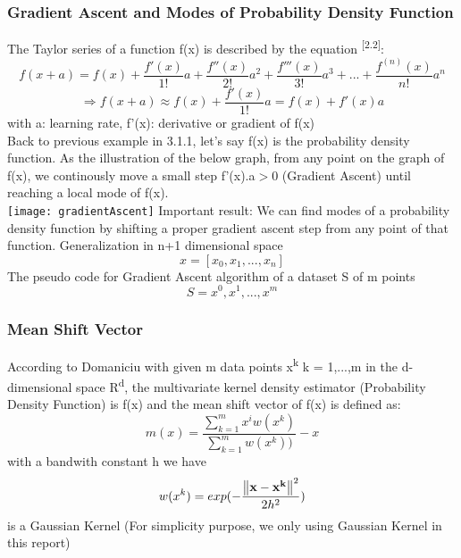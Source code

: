 \subsubsection{Gradient Ascent and Modes of Probability Density Function}
The Taylor series of a function f(x) is described by the equation \textsuperscript{[2.2]}:
\[
    f(x+a) = f(x) + \frac{f'(x)}{1!}a+\frac{f''(x)}{2!}a^2+\frac{f'''(x)}{3!}a^3+...+\frac{f^{(n)}(x)}{n!}a^n
\]
\[\Longrightarrow f(x+a) \approx f(x) + \frac{f'(x)}{1!}a =  f(x) + f'(x)a\]
with a: learning rate,  f'(x): derivative or gradient of f(x)\\
Back to previous example in 3.1.1, let's say f(x) is the probability density function. As the illustration of the below graph, from any point on the graph of f(x), we continously move a small step f'(x).a$>$0 (Gradient Ascent) until reaching a local mode of f(x).\\ 
\texttt{[image: gradientAscent]}
Important result: We can find modes of a probability density function by shifting a proper gradient ascent step from any point of that function. Generalization in n+1 dimensional space \[x=[x_0,x_1,...,x_n]\]
The pseudo code for Gradient Ascent algorithm of a dataset S of m points \[S = {x^0,x^1,...,x^m}\]

\subsubsection{Mean Shift Vector}

According to Domaniciu with given m data points x\textsuperscript{k} k = 1,...,m in the d-dimensional space R\textsuperscript{d}, the multivariate kernel density estimator (Probability Density Function) is f(x) and the mean shift vector of f(x) is defined as:
	\[m(x) = \frac{\sum_{k=1}^{m}x^i{w(x^k) }}{\sum_{k=1}^{m}{w(x^k) }) }-x\]
with a bandwith constant h we have \[w(x^k) = exp(-\frac{\norm{\vb{{x-x^k}}}^2}{2{h}^2})\] is a Gaussian Kernel (For simplicity purpose, we only using Gaussian Kernel in this report)

